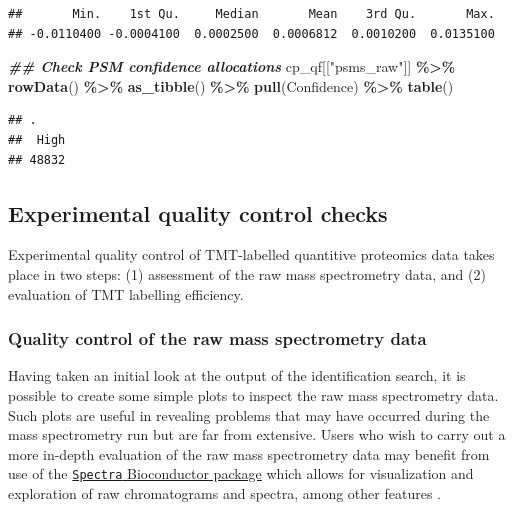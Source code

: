 \documentclass[9pt,a4paper,]{extarticle}
\newenvironment{Shaded}{\begin{snugshade}}{\end{snugshade}}
\newcommand{\DocumentationTok}[1]{\textcolor[rgb]{0.56,0.35,0.01}{\textbf{\textit{#1}}}}
\newcommand{\FunctionTok}[1]{\textcolor[rgb]{0.13,0.29,0.53}{\textbf{#1}}}
\newcommand{\NormalTok}[1]{#1}
\newcommand{\SpecialCharTok}[1]{\textcolor[rgb]{0.81,0.36,0.00}{\textbf{#1}}}
\newcommand{\StringTok}[1]{\textcolor[rgb]{0.31,0.60,0.02}{#1}}
\begin{document}
\begin{verbatim}
##       Min.    1st Qu.     Median       Mean    3rd Qu.       Max. 
## -0.0110400 -0.0004100  0.0002500  0.0006812  0.0010200  0.0135100
\end{verbatim}

\begin{Shaded}
\begin{Highlighting}[]
\DocumentationTok{\#\# Check PSM confidence allocations}
\NormalTok{cp\_qf[[}\StringTok{"psms\_raw"}\NormalTok{]] }\SpecialCharTok{\%\textgreater{}\%} 
  \FunctionTok{rowData}\NormalTok{() }\SpecialCharTok{\%\textgreater{}\%} 
  \FunctionTok{as\_tibble}\NormalTok{() }\SpecialCharTok{\%\textgreater{}\%} 
  \FunctionTok{pull}\NormalTok{(Confidence) }\SpecialCharTok{\%\textgreater{}\%} 
  \FunctionTok{table}\NormalTok{()}
\end{Highlighting}
\end{Shaded}

\begin{verbatim}
## .
##  High 
## 48832
\end{verbatim}

\hypertarget{experimental-quality-control-checks}{%
\subsection{Experimental quality control checks}\label{experimental-quality-control-checks}}

Experimental quality control of TMT-labelled quantitive proteomics data takes
place in two steps: (1) assessment of the raw mass spectrometry data, and (2)
evaluation of TMT labelling efficiency.

\hypertarget{quality-control-of-the-raw-mass-spectrometry-data}{%
\subsubsection{Quality control of the raw mass spectrometry data}\label{quality-control-of-the-raw-mass-spectrometry-data}}

Having taken an initial look at the output of the identification search, it is
possible to create some simple plots to inspect the raw mass spectrometry data.
Such plots are useful in revealing problems that may have occurred during
the mass spectrometry run but are far from extensive. Users who wish to carry
out a more in-depth evaluation of the raw mass spectrometry data may benefit
from use of the
\href{https://bioconductor.org/packages/release/bioc/html/Spectra.html}{\texttt{Spectra} Bioconductor package}
which allows for visualization and exploration of raw chromatograms and spectra,
among other features \citep{Rainer2022}.
\end{document}
